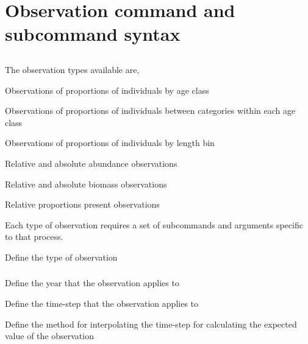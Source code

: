 \section{Observation command and subcommand syntax\label{sec:observation-syntax}}

\subsection{}

The observation types available are,

\begin{description}
  \item Observations of proportions of individuals by age class
  \item Observations of proportions of individuals between categories within each age class
  \item Observations of proportions of individuals by length bin
  \item Relative and absolute abundance observations
  \item Relative and absolute biomass observations
	\item Relative proportions present observations
\end{description}

Each type of observation requires a set of subcommands and arguments specific to that process.


 {Define the type of observation}

\subsubsection[Proportions at age]{}

 {Define the year that the observation applies to}

 {Define the time-step that the observation applies to}

 {Define the method for interpolating the time-step for calculating the expected value of the observation}

